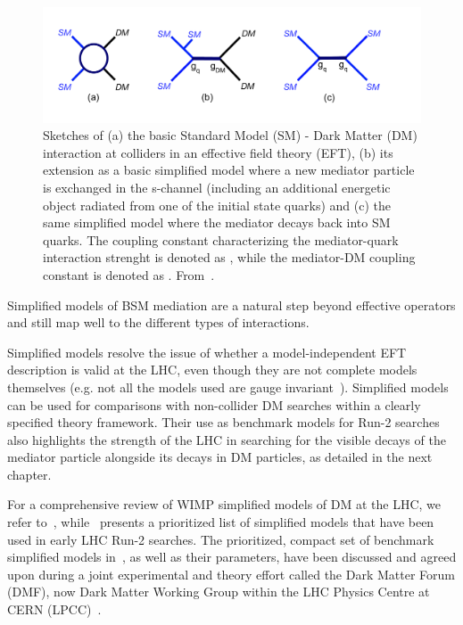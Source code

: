 \begin{figure}[!htpb]
\includegraphics[width=\textwidth]{figures/MonoX.pdf}
\caption{Sketches of (a) the basic Standard Model (SM) - Dark Matter (DM) interaction at colliders in an effective field theory (EFT), (b) its extension as a basic simplified model where a new mediator particle is exchanged in the s-channel (including an additional energetic object radiated from one of the initial state quarks) and (c) the same simplified model where the mediator decays back into SM quarks. The coupling constant characterizing the mediator-quark interaction strenght is denoted as \gq, while the mediator-DM coupling constant is denoted as \gdm. From~\cite{monoXfig}.}
\label{fig:monoX}
\end{figure}
Simplified models of BSM mediation are a natural step beyond effective operators and still map well to the different types of interactions. 

Simplified models resolve the issue of whether a model-independent EFT description is valid at the LHC, even though they are not complete models themselves (e.g. not all the models used are gauge invariant~\cite{Kahlhoefer:2015bea}). Simplified models can be used for comparisons with non-collider DM searches within a clearly specified theory framework. Their use as benchmark models for Run-2 searches also highlights the strength of the LHC in searching for the visible decays of the mediator particle alongside its decays in DM particles, as detailed in the next chapter. 

For a comprehensive review of WIMP simplified models of DM at the LHC, we refer to~\cite{Arcadi:2017kky}, while~\cite{Abercrombie:2015wmb} presents a prioritized list of simplified models that have been used in early LHC Run-2 searches. The prioritized, compact set of benchmark simplified models in~\cite{Abercrombie:2015wmb}, as well as their parameters, have been discussed and agreed upon during a joint experimental and theory effort called the Dark Matter Forum (DMF), now Dark Matter Working Group within the LHC Physics Centre at CERN (LPCC)~\cite{DMWG}. 

